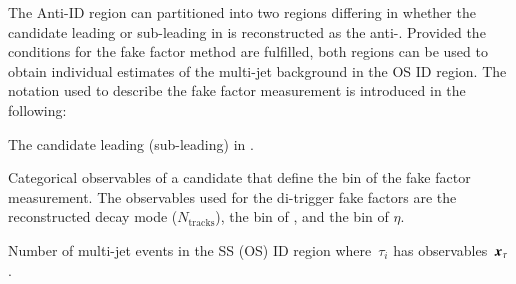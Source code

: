 {%
  \newcommand*{\ffargs}{\ensuremath{( \myvec{x}_{\tau} )}\xspace}

  \newcommand*{\NmjID}[2]{\ensuremath{N_\text{multi-jet}^{\text{#1, loose }\tau_{#2}}}\xspace}
  \newcommand*{\NmjIDIncl}[1]{\ensuremath{N_\text{multi-jet}^{\text{#1, ID}}}\xspace}

  \newcommand*{\NmjAntiIDIncl}[1]{\ensuremath{N_\text{multi-jet}^{\text{#1, Anti-ID}}}\xspace}
  \newcommand*{\NmjAntiID}[2]{\ensuremath{N_\text{multi-jet}^{\text{#1, anti-}\tau_{#2}}}\xspace}


  The Anti-ID region can partitioned into two regions differing in
  whether the \tauhadvis candidate leading or sub-leading in \pT is
  reconstructed as the anti-\tauhadvis. Provided the conditions for
  the fake factor method are fulfilled, both regions can be used to
  obtain individual estimates of the multi-jet background in the OS ID
  region. The notation used to describe the fake factor measurement is
  introduced in the following:
  \begin{description}[style=standard]
  \item[$\tau_0$ ($\tau_1$)] The \tauhadvis candidate leading (sub-leading) in \pT.

  \item[$\myvec{x}_\tau$] Categorical observables of a \tauhadvis
    candidate that define the bin of the fake factor measurement. The
    observables used for the di-\tauhadvis trigger fake factors are
    the reconstructed decay mode ($N_\text{tracks}$), the bin of
    \tauhadvis \pT, and the bin of \tauhadvis $\eta$.

  \item[$\NmjID{SS(OS)}{i}\ffargs$] Number of multi-jet events in the
    SS (OS) ID region where~$\tau_i$ has
    observables~$\myvec{x}_\tau$. 


\end{description}}
